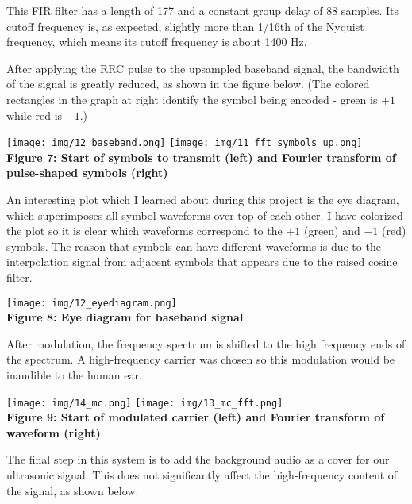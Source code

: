 \documentclass{article}
\begin{document}
This FIR filter has a length of 177 and a constant group delay of 88 samples.
Its cutoff frequency is, as expected, slightly more than 1/16th of the Nyquist
frequency, which means its cutoff frequency is about 1400 Hz.

\vspace{6pt}

After applying the RRC pulse to the upsampled baseband signal, the bandwidth of
the signal is greatly reduced, as shown in the figure below. (The colored
rectangles in the graph at right identify the symbol being encoded - green is
$+1$ while red is $-1$.)

\begin{center}
  \texttt{[image: img/12\_baseband.png]} \hspace{6pt}
  \texttt{[image: img/11\_fft\_symbols\_up.png]} \\
  \textbf{Figure 7: Start of symbols to transmit (left) and Fourier transform of pulse-shaped symbols (right)}
\end{center}

An interesting plot which I learned about during this project is the eye diagram,
which superimposes all symbol waveforms over top of each other. I have colorized
the plot so it is clear which waveforms correspond to the $+1$ (green) and $-1$
(red) symbols. The reason that symbols can have different waveforms is due to
the interpolation signal from adjacent symbols that appears due to the raised
cosine filter.

\begin{center}
  \texttt{[image: img/12\_eyediagram.png]} \\
  \textbf{Figure 8: Eye diagram for baseband signal}
\end{center}

After modulation, the frequency spectrum is shifted to the high frequency ends of
the spectrum. A high-frequency carrier was chosen so this modulation would be
inaudible to the human ear.

\begin{center}
  \texttt{[image: img/14\_mc.png]} \hspace{6pt}
  \texttt{[image: img/13\_mc\_fft.png]} \\
  \textbf{Figure 9: Start of modulated carrier (left) and Fourier transform of waveform (right)}
\end{center}

The final step in this system is to add the background audio as a cover for our
ultrasonic signal. This does not significantly affect the high-frequency content
of the signal, as shown below.
\end{document}
